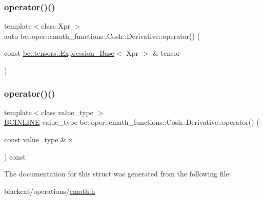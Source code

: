 \mbox{\label{structbc_1_1oper_1_1cmath__functions_1_1Cosh_1_1Derivative_add5b5b9092ee2bb86cdb991807b3639a}} 
\subsubsection{\texorpdfstring{operator()()}{operator()()}\hspace{0.1cm}{\footnotesize\ttfamily [2/3]}}
{\footnotesize\ttfamily template$<$class Xpr $>$ \\
auto bc\+::oper\+::cmath\+\_\+functions\+::\+Cosh\+::\+Derivative\+::operator() (\begin{DoxyParamCaption}\item[{const \hyperlink{classbc_1_1tensors_1_1Expression__Base}{bc\+::tensors\+::\+Expression\+\_\+\+Base}$<$ Xpr $>$ \&}]{tensor }\end{DoxyParamCaption})\hspace{0.3cm}{\ttfamily [inline]}}

\mbox{\label{structbc_1_1oper_1_1cmath__functions_1_1Cosh_1_1Derivative_ac2b5e4f159c2cea667615d96d4cb32db}} 
\subsubsection{\texorpdfstring{operator()()}{operator()()}\hspace{0.1cm}{\footnotesize\ttfamily [3/3]}}
{\footnotesize\ttfamily template$<$class value\+\_\+type $>$ \\
\hyperlink{common_8h_a6699e8b0449da5c0fafb878e59c1d4b1}{B\+C\+I\+N\+L\+I\+NE} value\+\_\+type bc\+::oper\+::cmath\+\_\+functions\+::\+Cosh\+::\+Derivative\+::operator() (\begin{DoxyParamCaption}\item[{const value\+\_\+type \&}]{x }\end{DoxyParamCaption}) const\hspace{0.3cm}{\ttfamily [inline]}}



The documentation for this struct was generated from the following file\+:\begin{DoxyCompactItemize}
\item 
blackcat/operations/\hyperlink{cmath_8h}{cmath.\+h}\end{DoxyCompactItemize}
